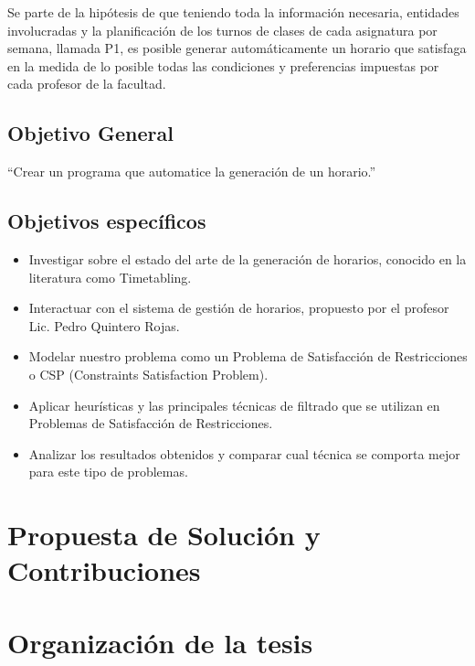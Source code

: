 \begin{introduction}
Se parte de la hipótesis de que teniendo toda la información necesaria, entidades involucradas y la
planificación de los turnos de clases de cada asignatura por semana, llamada P1, es posible generar
automáticamente un horario que satisfaga en la medida de lo posible todas las condiciones y preferencias
impuestas por cada profesor de la facultad.


\subsection*{Objetivo General}

``Crear un programa que automatice la generación de un horario.''

\subsection*{Objetivos específicos}

\begin{itemize}
	\item Investigar sobre el estado del arte de la generación de horarios, conocido en la literatura
		como Timetabling.
	\item Interactuar con el sistema de gestión de horarios, propuesto por el profesor Lic. Pedro
		Quintero Rojas.
	\item Modelar nuestro problema como un Problema de Satisfacción de Restricciones o CSP (Constraints 
		Satisfaction Problem).
	\item Aplicar heurísticas y las principales técnicas de filtrado que se utilizan en Problemas de
		Satisfacción de Restricciones.
	\item Analizar los resultados obtenidos y comparar cual técnica se comporta mejor para este tipo de
		problemas.
\end{itemize}

\section*{Propuesta de Solución y Contribuciones}

\section*{Organización de la tesis}

\end{introduction}
